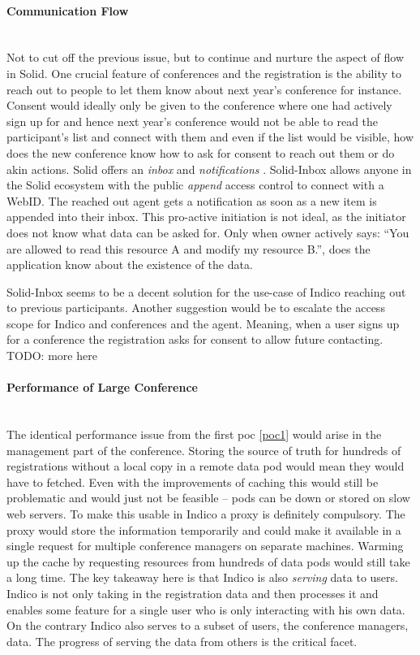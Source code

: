 \paragraph{Communication Flow}\mbox{}\\

Not to cut off the previous issue, but to continue and nurture the aspect of flow in Solid. One crucial feature of conferences and the registration is the ability to reach out to people to let them know about next year's conference for instance. Consent would ideally only be given to the conference where one had actively sign up for and hence next year's conference would not be able to read the participant's list and connect with them and even if the list would be visible, how does the new conference know how to ask for consent to reach out them or do akin actions. Solid offers an \textit{inbox} and \textit{notifications} \cite{solid-inbox}. Solid-Inbox allows anyone in the Solid ecosystem with the public \textit{append} access control to connect with a WebID. The reached out agent gets a notification as soon as a new item is appended into their inbox. This pro-active initiation is not ideal, as the initiator does not know what data can be asked for. Only when owner actively says: “You are allowed to read this resource A and modify my resource B.”, does the application know about the existence of the data.

Solid-Inbox seems to be a decent solution for the use-case of Indico reaching out to previous participants. Another suggestion would be to escalate the access scope for Indico and conferences and the agent. Meaning, when a user signs up for a conference the registration asks for consent to allow future contacting.
TODO: more here
\vspace{0.5cm}
\paragraph{Performance of Large Conference}\mbox{}\\

The identical performance issue from the first \gls{poc} \ref{poc1} would arise in the management part of the conference. Storing the source of truth for hundreds of registrations without a local copy in a remote data pod would mean they would have to fetched. Even with the improvements of caching this would still be problematic and would just not be feasible -- pods can be down or stored on slow web servers. To make this usable in Indico a proxy is definitely compulsory. The proxy would store the information temporarily and could make it available in a single request for multiple conference managers on separate machines. Warming up the cache by requesting resources from hundreds of data pods would still take a long time. 
The key takeaway here is that Indico is also \textit{serving} data to users. Indico is not only taking in the registration data and then processes it and enables some feature for a single user who is only interacting with his own data. On the contrary Indico also serves to a subset of users, the conference managers, data. The progress of serving the data from others is the critical facet.
\vspace{0.5cm}
